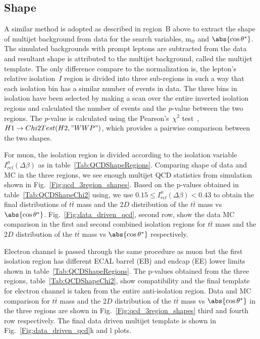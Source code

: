 \subsection{Shape}
%
A similar method is adopted as described in region~B above to extract the shape of multijet background from data for the search variables, m$_{tt}$ and $\abs{\cos\theta^*}$. The simulated backgrounds with prompt leptons are subtracted from the data and resultant shape is attributed to the multijet background, called the multijet template. The only difference compare to the normalization is, the lepton's relative isolation~$I$ region is divided into three sub-regions in such a way that each isolation bin has a similar number of events in data. The three bins in isolation have been selected by making a scan over the entire inverted isolation regions and calculated the number of events and the $p$-value between the two regions. The $p$-value is calculated using the Pearson's~$\chi^2$ test~\cite{chi2_test}, $H1 \rightarrow Chi2Test(H2, "WW P")$, which provides a pairwise comparison between the two shapes.  

For muon, the isolation region is divided according to the isolation variable $I_{rel}^{\mu}(\Delta\beta)$ as in table~\ref{Tab:QCDShapeRegions}. Comparing shape of data and MC in the three regions, we see enough multijet QCD statistics from simulation shown in Fig.~\ref{Fig:qcd_3region_shapes}. Based on the p-values obtained in table~\ref{Tab:QCDShapeChi2} using, we use $0.15 \leq I_{rel}^{\mu}(\Delta\beta) < 0.43$ to obtain the final distributions of $t\bar{t}$ mass and the 2$D$ distribution of the $t\bar{t}$ mass vs $\abs{\cos\theta^*}$. Fig.~\ref{Fig:data_driven_qcd}, second row, show the data MC comparison in the first and second combined isolation regions for $t\bar{t}$ mass and the 2$D$ distribution of the $t\bar{t}$ mass vs $\abs{\cos\theta^*}$ respectively.  

Electron channel is passed through the same procedure as muon but the first isolation region has different ECAL barrel (EB) and endcap (EE) lower limits shown in table~\ref{Tab:QCDShapeRegions}. The p-values obtained from the three regions, table~\ref{Tab:QCDShapeChi2}, show compatibility and the final template for electron channel is taken from the entire anti-isolation region. Data and MC comparison for $t\bar{t}$ mass and the 2$D$ distribution of the $t\bar{t}$ mass vs $\abs{\cos\theta^*}$ in the three regions are shown in Fig.~\ref{Fig:qcd_3region_shapes} third and fourth row respectively. The final data driven multijet template is shown in Fig.~\ref{Fig:data_driven_qcd}k and l plots.    

